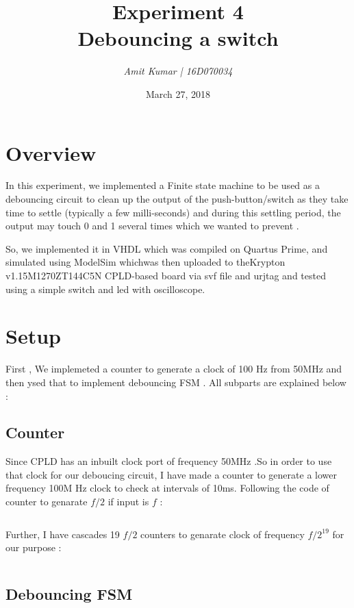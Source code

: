 \documentclass[a4paper, 11pt]{article}
\title{\bf Experiment 4\\\vspace*{2mm} Debouncing a switch}
\author{\it Amit Kumar | 16D070034}
\date{March 27, 2018}
\begin{document}
\maketitle
\section*{Overview}
In this experiment, we implemented a Finite state machine to be used as a debouncing circuit to clean up the output of the push-button/switch as they take time to settle (typically a few milli-seconds) and during this settling period, the output may touch 0 and 1 several times which we wanted to prevent .
 
\noindent So, we implemented it in VHDL which  was  compiled  on  Quartus  Prime,  and  simulated using  ModelSim  whichwas then uploaded to theKrypton v1.15M1270ZT144C5N CPLD-based board via svf file and urjtag and tested using a simple switch and led with oscilloscope.

\section{Setup}
First , We implemeted a counter to generate a clock of 100 Hz from 50MHz and then ysed that to implement debouncing FSM . All subparts are explained below :

\subsection{Counter}

Since CPLD has an inbuilt clock port of frequency 50MHz .So in order to use that clock for our deboucing circuit, I have made a counter to generate a lower frequency 100M Hz clock to check at intervals of 10ms.
Following the code of counter to genarate $f/2$ if input is $f$ : \\
\inputminted[linenos]{vhdl}{counter.vhd}

\noindent Further, I have cascades 19 $f/2$ counters to genarate clock of frequency $f/2^19$ for our purpose :
\inputminted[linenos]{vhdl}{counter2.vhd}

\subsection{Debouncing FSM}
\end{document}
